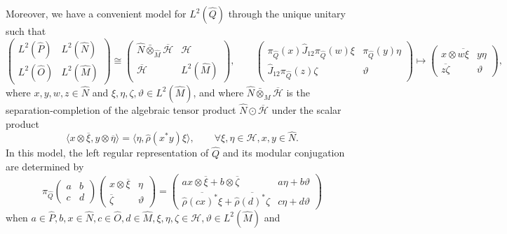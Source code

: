 \documentclass[reqno]{amsart}
\numberwithin{equation}{section}
\newcommand{\Hsp}{\mathcal{H}}
\begin{document}
Moreover, we have a convenient model for $L^2(\hat{Q})$ through the unique unitary such that
\begin{equation}\label{EqStandardMorita}
 \begin{pmatrix} L^2(\hat{P}) & L^2(\hat{N}) \\ L^2(\hat{O}) & L^2(\hat{M}) \end{pmatrix}
 \cong 
\begin{pmatrix} \hat{N} \bar{\otimes}_{\hat{M}}\overline{\Hsp}  & \Hsp \\ \overline{\Hsp} & L^2(\hat{M}) \end{pmatrix},
\qquad  
 \begin{pmatrix} \pi_{\hat{Q}}(x)\hat{J}_{12}\pi_{\hat{Q}}(w)\xi & \pi_{\hat{Q}}(y)\eta \\ \hat{J}_{12} \pi_{\hat{Q}}(z) \zeta & \vartheta\end{pmatrix}
 \mapsto
 \begin{pmatrix} x\otimes \overline{w\xi} & y\eta \\ \overline{z\zeta} & \vartheta\end{pmatrix},
\end{equation}
where $x,y,w,z\in \hat{N}$ and $\xi,\eta,\zeta,\vartheta\in L^2(\hat{M})$, and where $\hat{N} \bar{\otimes}_{\hat{M}}\overline{\Hsp}$ is the separation-completion of the algebraic tensor product $\hat{N} \odot \overline{\Hsp}$ under the scalar product 
\[
\langle x\otimes \overline{\xi} , y\otimes \overline{\eta}\rangle = \langle \eta , \hat{\rho}(x^*y)\xi\rangle,\qquad \forall \xi,\eta\in \Hsp,x,y\in \hat{N}. 
\] 
In this model, the left regular representation of $\hat{Q}$ and its modular conjugation are determined by 
\begin{equation}\label{EqMoritaLeftAction}
\pi_{\hat{Q}}\begin{pmatrix} a & b \\ c & d \end{pmatrix} \begin{pmatrix} x\otimes \overline{\xi} & \eta \\ \overline{\zeta} & \vartheta\end{pmatrix} = \begin{pmatrix} ax\otimes \overline{\xi} + b\otimes \overline{\zeta} & a\eta + b\vartheta \\ \overline{\hat{\rho}(cx)^*\xi} + \overline{\hat{\rho}(d)^*\zeta} & c\eta + d\vartheta\end{pmatrix}
\end{equation}
when $a\in \hat{P},b,x\in\hat{N},c\in\hat{O},d\in \hat{M}, \xi,\eta,\zeta\in \Hsp, \vartheta\in L^2(\hat{M})$ and
\end{document}
